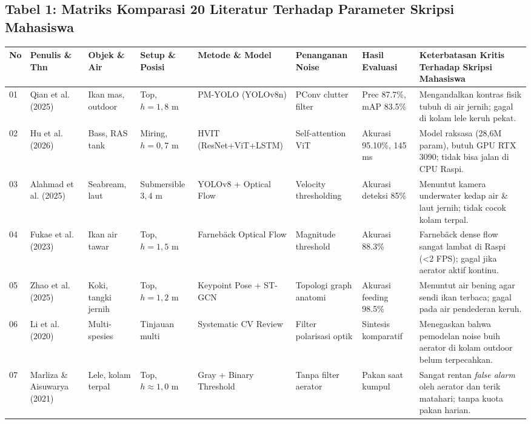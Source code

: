 \documentclass[10pt,a4paper]{article}
\providecommand{\text}[1]{\mbox{#1}}
\begin{document}
\subsection*{Tabel 1: Matriks Komparasi 20 Literatur Terhadap Parameter Skripsi Mahasiswa}
\vspace{-0.2cm}
{\scriptsize
\setlength{\tabcolsep}{2pt}
\begin{center}
\begin{tabular}{|p{0.35cm}|p{2.2cm}|p{2.0cm}|p{1.5cm}|p{2.3cm}|p{2.0cm}|p{1.8cm}|p{4.7cm}|}
\hline
\textbf{No} & \textbf{Penulis \& Thn} & \textbf{Objek \& Air} & \textbf{Setup \& Posisi} & \textbf{Metode \& Model} & \textbf{Penanganan Noise} & \textbf{Hasil Evaluasi} & \textbf{Keterbatasan Kritis Terhadap Skripsi Mahasiswa} \\
\hline
01 & Qian et al. (2025) & Ikan mas, outdoor & Top, $h=1,8\text{ m}$ & PM-YOLO (YOLOv8n) & PConv clutter filter & Prec 87.7\%, mAP 83.5\% & Mengandalkan kontras fisik tubuh di air jernih; gagal di kolam lele keruh pekat. \\
\hline
02 & Hu et al. (2026) & Bass, RAS tank & Miring, $h=0,7\text{ m}$ & HVIT (ResNet+ViT+LSTM) & Self-attention ViT & Akurasi 95.10\%, 145 ms & Model raksasa (28,6M param), butuh GPU RTX 3090; tidak bisa jalan di CPU Raspi. \\
\hline
03 & Alahmad et al. (2025) & Seabream, laut & Submersible $3,4\text{ m}$ & YOLOv8 + Optical Flow & Velocity thresholding & Akurasi deteksi 85\% & Menuntut kamera underwater kedap air \& laut jernih; tidak cocok kolam terpal. \\
\hline
04 & Fukae et al. (2023) & Ikan air tawar & Top, $h=1,5\text{ m}$ & Farnebäck Optical Flow & Magnitude threshold & Akurasi 88.3\% & Farnebäck dense flow sangat lambat di Raspi (<2 FPS); gagal jika aerator aktif kontinu. \\
\hline
05 & Zhao et al. (2025) & Koki, tangki jernih & Top, $h=1,2\text{ m}$ & Keypoint Pose + ST-GCN & Topologi graph anatomi & Akurasi feeding 98.5\% & Menuntut air bening agar sendi ikan terbaca; gagal pada air pendederan keruh. \\
\hline
06 & Li et al. (2020) & Multi-spesies & Tinjauan multi & Systematic CV Review & Filter polarisasi optik & Sintesis komparatif & Menegaskan bahwa pemodelan noise buih aerator di kolam outdoor belum terpecahkan. \\
\hline
07 & Marliza \& Aisuwarya (2021) & Lele, kolam terpal & Top, $h\approx 1,0\text{ m}$ & Gray + Binary Threshold & Tanpa filter aerator & Pakan saat kumpul & Sangat rentan \textit{false alarm} oleh aerator dan terik matahari; tanpa kuota pakan harian. \\

\end{tabular}
\end{center}}
\end{document}
